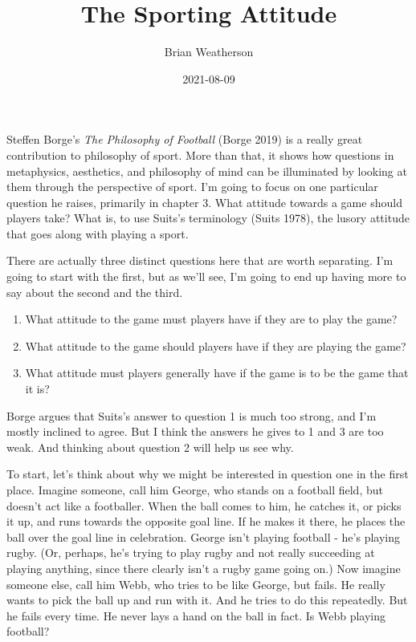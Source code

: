 \documentclass[
  12pt,
]{article}
\title{The Sporting Attitude}
\author{Brian Weatherson}
\date{2021-08-09}
\providecommand{\tightlist}{%
  \setlength{\itemsep}{0pt}\setlength{\parskip}{0pt}}
\begin{document}
\maketitle

Steffen Borge's \emph{The Philosophy of Football} (Borge 2019) is a really great contribution to philosophy of sport. More than that, it shows how questions in metaphysics, aesthetics, and philosophy of mind can be illuminated by looking at them through the perspective of sport. I'm going to focus on one particular question he raises, primarily in chapter 3. What attitude towards a game should players take? What is, to use Suits's terminology (Suits 1978), the lusory attitude that goes along with playing a sport.

There are actually three distinct questions here that are worth separating. I'm going to start with the first, but as we'll see, I'm going to end up having more to say about the second and the third.

\begin{enumerate}
\def\labelenumi{\arabic{enumi}.}
\tightlist
\item
  What attitude to the game must players have if they are to play the game?
\item
  What attitude to the game should players have if they are playing the game?
\item
  What attitude must players generally have if the game is to be the game that it is?
\end{enumerate}

Borge argues that Suits's answer to question 1 is much too strong, and I'm mostly inclined to agree. But I think the answers he gives to 1 and 3 are too weak. And thinking about question 2 will help us see why.

To start, let's think about why we might be interested in question one in the first place. Imagine someone, call him George, who stands on a football field, but doesn't act like a footballer. When the ball comes to him, he catches it, or picks it up, and runs towards the opposite goal line. If he makes it there, he places the ball over the goal line in celebration. George isn't playing football - he's playing rugby. (Or, perhaps, he's trying to play rugby and not really succeeding at playing anything, since there clearly isn't a rugby game going on.) Now imagine someone else, call him Webb, who tries to be like George, but fails. He really wants to pick the ball up and run with it. And he tries to do this repeatedly. But he fails every time. He never lays a hand on the ball in fact. Is Webb playing football?
\end{document}
